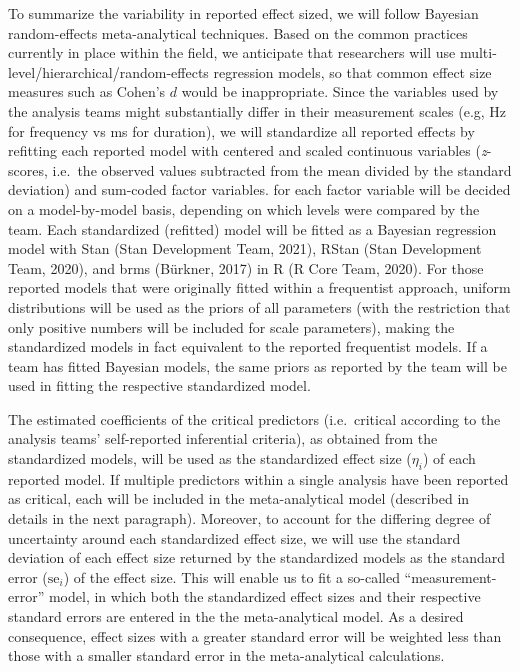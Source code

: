 \documentclass[
  english,
  man,floatsintext]{apa6}
\begin{document}
To summarize the variability in reported effect sized, we will follow Bayesian random-effects meta-analytical techniques.
Based on the common practices currently in place within the field, we anticipate that researchers will use multi-level/hierarchical/random-effects regression models, so that common effect size measures such as Cohen's \(d\) would be inappropriate.
Since the variables used by the analysis teams might substantially differ in their measurement scales (e.g, Hz for frequency vs ms for duration), we will standardize all reported effects by refitting each reported model with centered and scaled continuous variables (\emph{z}-scores, i.e.~the observed values subtracted from the mean divided by the standard deviation) and sum-coded factor variables.
 for each factor variable will be decided on a model-by-model basis, depending on which levels were compared by the team.
Each standardized (refitted) model will be fitted as a Bayesian regression model with Stan (Stan Development Team, 2021), RStan (Stan Development Team, 2020), and brms (Bürkner, 2017) in R (R Core Team, 2020).
For those reported models that were originally fitted within a frequentist approach, uniform distributions will be used as the priors of all parameters (with the restriction that only positive numbers will be included for scale parameters), making the standardized models in fact equivalent to the reported frequentist models.
If a team has fitted Bayesian models, the same priors as reported by the team will be used in fitting the respective standardized model.

The estimated coefficients of the critical predictors (i.e.~critical according to the analysis teams' self-reported inferential criteria), as obtained from the standardized models, will be used as the standardized effect size (\(\eta_i\)) of each reported model.
If multiple predictors within a single analysis have been reported as critical, each will be included in the meta-analytical model (described in details in the next paragraph).
Moreover, to account for the differing degree of uncertainty around each standardized effect size, we will use the standard deviation of each effect size returned by the standardized models as the standard error (\(\text{se}_i\)) of the effect size.
This will enable us to fit a so-called ``measurement-error'' model, in which both the standardized effect sizes and their respective standard errors are entered in the the meta-analytical model.
As a desired consequence, effect sizes with a greater standard error will be weighted less than those with a smaller standard error in the meta-analytical calculations.
\end{document}
